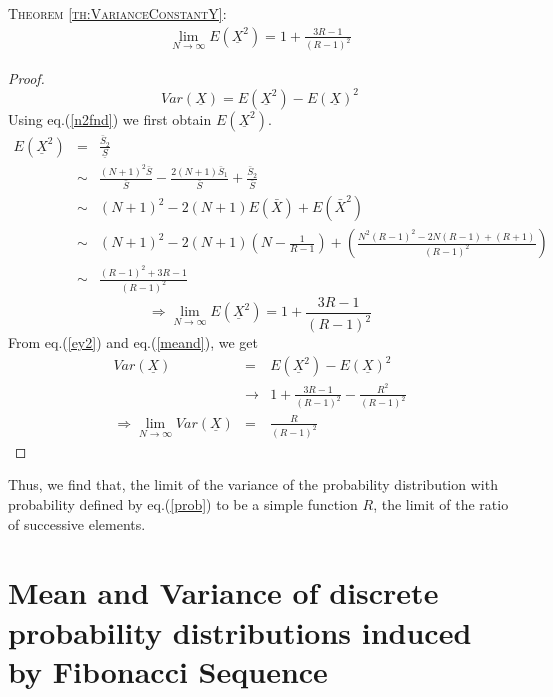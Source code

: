 \begin{multicols}{2}
\textsc{Theorem {\ref{th:VarianceConstantY}}:}
\begin{eqnarray*}
\displaystyle{\lim_{N \rightarrow \infty}}E(\underline{X}^2) = 1 + \displaystyle{\frac{3R-1}{(R-1)^2}}
\end{eqnarray*}
\begin{proof}\renewcommand{\qedsymbol}{}
\begin{equation}
Var(\underline{X}) = E(\underline{X}^2) - E(\underline{X})^2\label{eq-7.4}
\end{equation}
Using eq.(\ref{n2fnd}) we first obtain $E(\underline{X}^2)$.
{\fontsize{6}{7}\selectfont
\begin{eqnarray}
E(\underline{X}^2) &=& \frac{\bar{S}_2}{\underline{S}} \nonumber\\
&\sim& \frac{(N+1)^2\bar{S}}{\bar{S}} - \frac{2(N+1)\bar{S}_1}{\bar{S}} + \frac{\bar{S}_2}{\bar{S}}\nonumber\\
&\sim& (N+1)^2 - 2(N+1)E(\bar{X}) +E(\bar{X}^2)\nonumber\\
&\sim& (N+1)^2 - 2(N+1)\left(N-\frac{1}{R-1}\right) + \left(\frac{N^2(R-1)^2 - 2N(R-1)+(R+1)}{(R-1)^2}\right)\nonumber\\
&\sim& \frac{(R-1)^2 +3R -1}{(R-1)^2}\nonumber
\end{eqnarray}}
\normalsize
\begin{equation}
\Rightarrow \lim_{N \rightarrow \infty}E(\underline{X}^2) = 1 + \displaystyle{\frac{3R-1}{(R-1)^2}}\label{eq-7.5}
\end{equation} 
From eq.(\ref{ey2}) and eq.(\ref{meand}), we get 
\begin{eqnarray}
Var(\underline{X}) &=& E(\underline{X}^2) - E(\underline{X})^2\nonumber\\
&\rightarrow& 1 + \frac{3R-1}{(R-1)^2} - \frac{R^2}{(R-1)^2}\nonumber\\ 
\Rightarrow \lim_{N \rightarrow \infty}Var(\underline{X}) &=& \frac{R}{(R-1)^2}\label{eq-7.6}
\end{eqnarray}
\end{proof}

Thus, we find that, the limit of the variance of the probability distribution with probability defined by eq.(\ref{prob}) to be a simple function $R$, the limit of the ratio of successive elements.

\section{Mean and Variance of discrete probability distributions induced by Fibonacci Sequence}\label{section-8}


\end{multicols}
